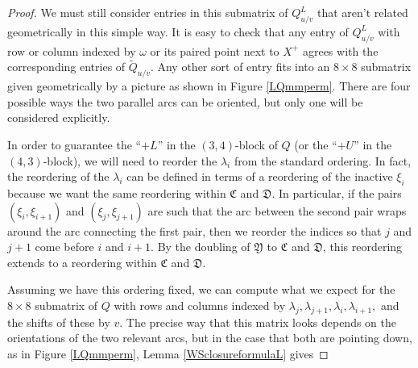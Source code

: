 \documentclass[11pt]{amsart}
\theoremstyle{plain}
\theoremstyle{definition}
\theoremstyle{remark}
\begin{document}
\begin{proof}
We must still consider entries in this submatrix of $Q_{u/v}^L$ that aren't related geometrically in this simple way. It is easy to check that any entry of $Q_{u/v}^L$ with row or column indexed by $\omega$ or its paired point next to $X^+$ agrees with the corresponding entries of $\widetilde{Q}_{u/v}$. Any other sort of entry fits into an $8\times 8$ submatrix given geometrically by a picture as shown in Figure \ref{LQmmperm}. There are four possible ways the two parallel arcs can be oriented, but only one will be considered explicitly.

In order to guarantee the ``$+L$'' in the $(3,4)$-block of $Q$ (or the ``$+U$'' in the $(4,3)$-block), we will need to reorder the $\lambda_i$ from the standard ordering. In fact, the reordering of the $\lambda_i$ can be defined in terms of a reordering of the 
inactive $\xi_i$ because we want the same reordering within $\mathfrak{C}$ and $\mathfrak{D}$. In particular, if the pairs $(\xi_i,\xi_{i+1})$ and $(\xi_j,\xi_{j+1})$ are such that the arc between the second pair wraps around the arc connecting the first pair, then we reorder the indices so that $j$ and $j+1$ come before $i$ and $i+1$. By the doubling of $\mathfrak{Y}$ to $\mathfrak{C}$ and $\mathfrak{D}$, this reordering extends to a reordering within $\mathfrak{C}$ and $\mathfrak{D}$.

Assuming we have this ordering fixed, we can compute what we expect for the $8\times 8$ submatrix of $Q$ with rows and columns indexed by $\lambda_j,\lambda_{j+1},\lambda_i,\lambda_{i+1},$ and the shifts of these by $v$. The precise way that this matrix looks depends on the orientations of the two relevant arcs, but in the case that both are pointing down, as in Figure \ref{LQmmperm}, Lemma \ref{WSclosureformulaL} gives



\end{proof}
\end{document}
